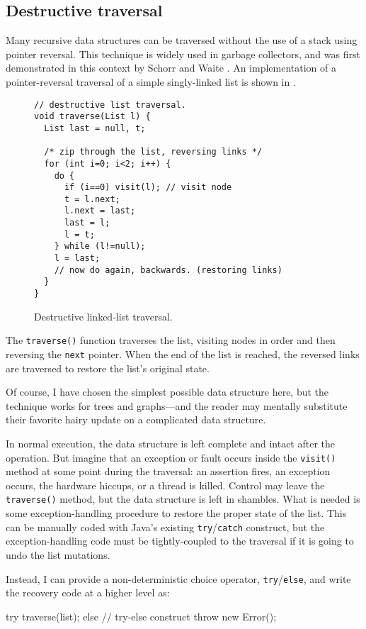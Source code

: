 \subsection{Destructive traversal}\label{sec:destruct}
Many recursive data structures can be traversed without the use of a
stack using pointer reversal.  This technique is widely used in
garbage collectors, and was first demonstrated in this context by
Schorr and Waite \cite{SchorrWa67}.  An implementation of a
pointer-reversal traversal of a simple singly-linked list is shown in
.
\begin{figure}\sis\fontsize{9}{10}\begin{verbatim}
// destructive list traversal.
void traverse(List l) {
  List last = null, t;
  
  /* zip through the list, reversing links */
  for (int i=0; i<2; i++) {
    do {
      if (i==0) visit(l); // visit node
      t = l.next;
      l.next = last;
      last = l;
      l = t;
    } while (l!=null);
    l = last;
    // now do again, backwards. (restoring links)
  }
}
\end{verbatim}
\caption{Destructive linked-list traversal.}
\label{fig:destruct-list}
\end{figure}

The \texttt{traverse()} function traverses the list, visiting nodes in
order and then reversing the {\tt next} pointer.  When the end of the
list is reached, the reversed links are traversed to restore the
list's original state.

Of course, I have chosen the simplest possible data structure here, but
the technique works for trees and graphs---and the reader may mentally
substitute their favorite hairy update on a complicated data
structure.

In normal execution, the data structure is left complete and intact
after the operation.  But
imagine that an exception or fault occurs inside the {\tt visit()} method
at some point during the traversal: an assertion fires, an exception
occurs, the hardware hiccups, or a thread is killed.  Control may
leave the {\tt traverse()} method, but the data structure is left in
shambles.  What is needed is some exception-handling procedure to
restore the proper state of the list.  This can be manually coded with
Java's existing {\tt try}/{\tt catch} construct, but the
exception-handling code must be tightly-coupled to the traversal if it
is going to undo the list mutations.

Instead, I can provide a non-deterministic choice operator,
{\tt try}/{\tt else}, and write the recovery code at a higher level as:
\begin{inlinecode}
try {
  traverse(list);
} else { // try-else construct
  throw new Error();
}
\end{inlinecode}

